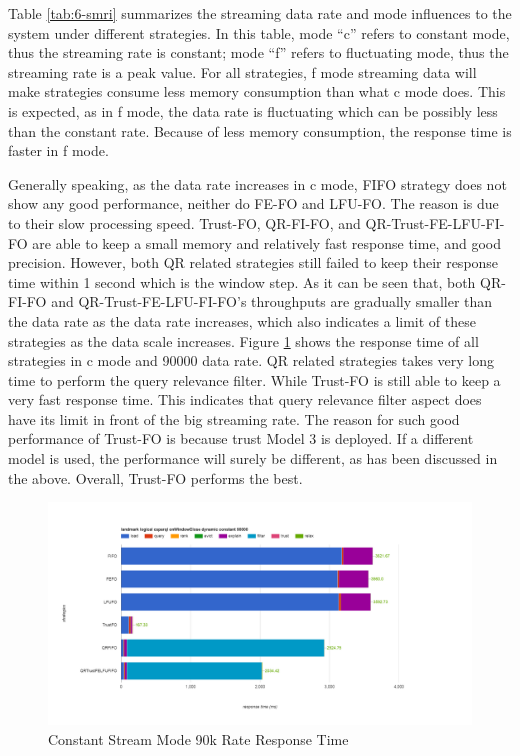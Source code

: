 Table \ref{tab:6-smri} summarizes the streaming data rate and mode influences to the system under different strategies. 
In this table, mode ``c'' refers to constant mode, thus the streaming rate is constant;
mode ``f'' refers to fluctuating mode, thus the streaming rate is a peak value. 
For all strategies, f mode streaming data will make strategies consume less memory consumption than what c mode does. 
This is expected, as in f mode, the data rate is fluctuating which can be possibly less than the constant rate. 
Because of less memory consumption, the response time is faster in f mode. 

Generally speaking, as the data rate increases in c mode, FIFO strategy does not show any good performance, neither do FE-FO and LFU-FO.
The reason is due to their slow processing speed. 
Trust-FO, QR-FI-FO, and QR-Trust-FE-LFU-FI-FO are able to keep a small memory and relatively fast response time, and good precision. 
However, both QR related strategies still failed to keep their response time within 1 second which is the window step. 
As it can be seen that, both QR-FI-FO and QR-Trust-FE-LFU-FI-FO's throughputs are gradually smaller than the data rate as the data rate increases, which also indicates a limit of these strategies as the data scale increases. 
Figure \ref{fig:6-csmrrt} shows the response time of all strategies in c mode and 90000 data rate. 
QR related strategies takes very long time to perform the query relevance filter. 
While Trust-FO is still able to keep a very fast response time. 
This indicates that query relevance filter aspect does have its limit in front of the big streaming rate. 
The reason for such good performance of Trust-FO is because trust Model 3 is deployed. 
If a different model is used, the performance will surely be different, as has been discussed in the above. 
Overall, Trust-FO performs the best. 

\begin{figure}[!htbp]
	\centering
    \includegraphics[width=6.5in]{img/6-9wt.png}
    \caption{Constant Stream Mode 90k Rate Response Time}
    \label{fig:6-csmrrt}
\end{figure}


